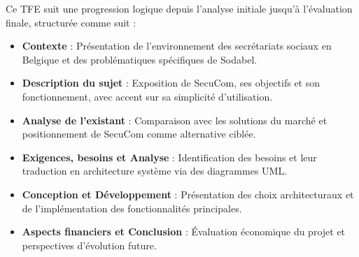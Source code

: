 Ce TFE suit une progression logique depuis l'analyse initiale jusqu'à l'évaluation finale, structurée comme suit :

\begin{itemize}[leftmargin=*,label=\textcolor{darkgray}{$\bullet$},itemsep=0.3em]
  \item \textbf{Contexte} : Présentation de l'environnement des secrétariats sociaux en Belgique et des problématiques spécifiques de Sodabel.
  
  \item \textbf{Description du sujet} : Exposition de SecuCom, ses objectifs et son fonctionnement, avec accent sur sa simplicité d'utilisation.
  
  \item \textbf{Analyse de l'existant} : Comparaison avec les solutions du marché et positionnement de SecuCom comme alternative ciblée.
  
  \item \textbf{Exigences, besoins et Analyse} : Identification des besoins et leur traduction en architecture système via des diagrammes UML.
  
  \item \textbf{Conception et Développement} : Présentation des choix architecturaux et de l'implémentation des fonctionnalités principales.
  
  \item \textbf{Aspects financiers et Conclusion} : Évaluation économique du projet et perspectives d'évolution future.
\end{itemize}
